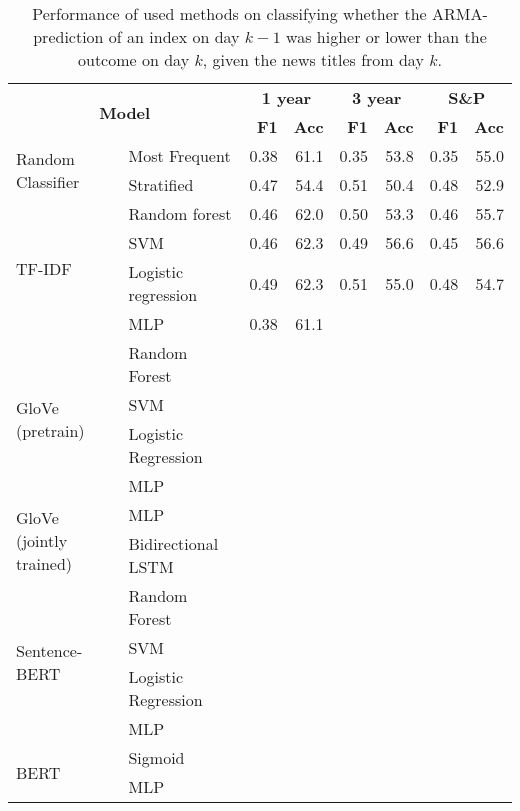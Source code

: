 \begin{table}[H]
    \centering
    \begin{tabular}{llrrrrrr}
    \hline
        \multicolumn{2}{c}{\multirow{2}{*}{\textbf{Model}}} & \multicolumn{2}{c}{\textbf{1 year}} & \multicolumn{2}{c}{\textbf{3 year}} & \multicolumn{2}{c}{\textbf{S\&P}} \\
      & & \textbf{F1} & \textbf{Acc} & \textbf{F1} & \textbf{Acc} & \textbf{F1} & \textbf{Acc} \\
        \hline \hline   
        \multirow{2}{*}{Random Classifier} & Most Frequent & 0.38 & 61.1 & 0.35 & 53.8 & 0.35 & 55.0  \\
        & Stratified & 0.47 & 54.4 & 0.51 & 50.4 & 0.48 & 52.9  \\
        \hline 
        \multirow{4}{*}{TF-IDF} & Random forest & 0.46 & 62.0 & 0.50 & 53.3 & 0.46 & 55.7  \\
        & SVM & 0.46 & 62.3 & 0.49 & 56.6 & 0.45 & 56.6 \\
        & Logistic regression & 0.49 & 62.3 & 0.51 & 55.0 & 0.48 & 54.7 \\
        & MLP & 0.38 & 61.1 &   \\
        \hline 
        \multirow{4}{*}{GloVe (pretrain)} & Random Forest &
        \\
        & SVM &
        \\
        & Logistic Regression &
        \\
        & MLP &  \\
        \hline 
        \multirow{2}{*}{GloVe (jointly trained)} & MLP & \\
        & Bidirectional LSTM & \\
        \hline 
        \multirow{4}{*}{Sentence-BERT} & Random Forest & \\
        & SVM &  \\
        & Logistic Regression &   \\
        & MLP &  \\
        \hline
        \multirow{2}{*}{BERT} & Sigmoid & \\
        & MLP & \\
        \hline
    \end{tabular}
\caption{Performance of used methods on classifying whether the ARMA-prediction of an index on day $k-1$ was higher or lower than the outcome on day $k$, given the news titles from day $k$.}
\label{tab:temporary}
\end{table}


